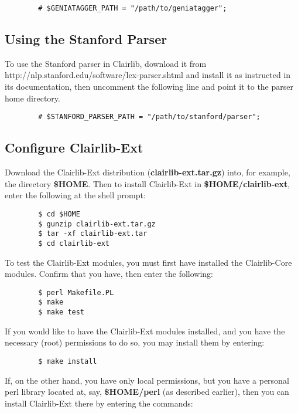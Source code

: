 \begin{verbatim}
        # $GENIATAGGER_PATH = "/path/to/geniatagger";
\end{verbatim}
\subsection*{Using the Stanford Parser\label{Using_the_Stanford_Parser}}


To use the Stanford parser in Clairlib, download it from \textsf{http://nlp.stanford.edu/software/lex-parser.shtml} and install it as instructed in its documentation, then uncomment the following line and point it to the parser home directory.

\begin{verbatim}
        # $STANFORD_PARSER_PATH = "/path/to/stanford/parser";
\end{verbatim}
\subsection*{Configure Clairlib-Ext\label{Configure_Clairlib-Ext}}


Download the Clairlib-Ext distribution (\textbf{clairlib-ext.tar.gz}) into, for example, the directory \textbf{\$HOME}. Then to install Clairlib-Ext in \textbf{\$HOME/clairlib-ext}, enter the following at the shell prompt:

\begin{verbatim}
        $ cd $HOME
        $ gunzip clairlib-ext.tar.gz
        $ tar -xf clairlib-ext.tar
        $ cd clairlib-ext
\end{verbatim}


To test the Clairlib-Ext modules, you must first have installed the Clairlib-Core modules. Confirm that you have, then enter the following:

\begin{verbatim}
        $ perl Makefile.PL
        $ make
        $ make test
\end{verbatim}


If you would like to have the Clairlib-Ext modules installed, and you have the necessary (root) permissions to do so, you may install them by entering:

\begin{verbatim}
        $ make install
\end{verbatim}


If, on the other hand, you have only local permissions, but you have a personal perl library located at, say, \textbf{\$HOME/perl} (as described earlier), then you can install Clairlib-Ext there by entering the commands:

